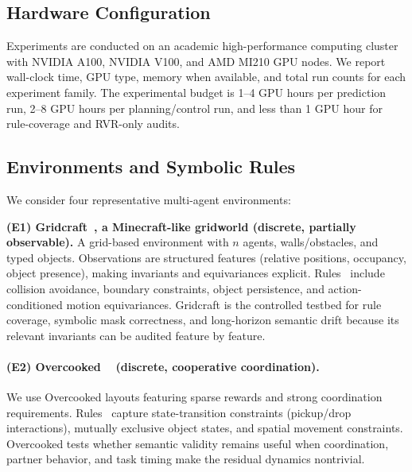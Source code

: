 \documentclass{article}
\theoremstyle{plain}
\theoremstyle{definition}
\theoremstyle{remark}
\begin{document}
\subsection{Hardware Configuration}
\label{sec:resources}

Experiments are conducted on an academic high-performance computing cluster with NVIDIA A100, NVIDIA V100, and AMD MI210 GPU nodes. We report wall-clock time, GPU type, memory when available, and total run counts for each experiment family. The experimental budget is 1--4 GPU hours per prediction run, 2--8 GPU hours per planning/control run, and less than 1 GPU hour for rule-coverage and RVR-only audits.

\subsection{Environments and Symbolic Rules}
\label{sec:envs}

We consider four representative multi-agent environments:

\textbf{(E1) Gridcraft~\hyperref[fn:gridcraft]{\footnotemark[2]}, a Minecraft-like gridworld (discrete, partially observable).}
A grid-based environment with $n$ agents, walls/obstacles, and typed objects.
Observations are structured features (relative positions, occupancy, object presence),
making invariants and equivariances explicit.
Rules~\hyperref[fn:github]{\footnotemark[1]} include collision avoidance, boundary constraints, object persistence, and action-conditioned motion equivariances.
Gridcraft is the controlled testbed for rule coverage, symbolic mask correctness, and long-horizon semantic drift because its relevant invariants can be audited feature by feature.


\paragraph{(E2) Overcooked ~\cite{Micah2020overcooked} (discrete, cooperative coordination).}
We use Overcooked layouts featuring sparse rewards and strong coordination requirements.
Rules~\hyperref[fn:github]{\footnotemark[1]} capture state-transition constraints (pickup/drop interactions), mutually exclusive object states,
and spatial movement constraints.
Overcooked tests whether semantic validity remains useful when coordination, partner behavior, and task timing make the residual dynamics nontrivial.
\end{document}
